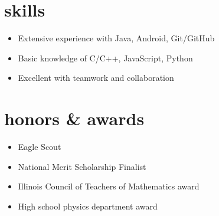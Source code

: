 \documentclass[]{resume}
\begin{document}

\section{skills}

\noindent\begin{itemize}[leftmargin=0.45cm]
\setlength{\itemsep}{-5pt}
\item Extensive experience with Java, Android, Git/GitHub
\item Basic knowledge of C/C++, JavaScript, Python
\item Excellent with teamwork and collaboration
\end{itemize}\vspace{\parskip}



\section{honors \& awards}

\noindent\begin{itemize}[leftmargin=0.45cm]
\setlength{\itemsep}{-5pt}
\item Eagle Scout
\item National Merit Scholarship Finalist
\item Illinois Council of Teachers of Mathematics award
\item High school physics department award
\end{itemize}
\end{document}
